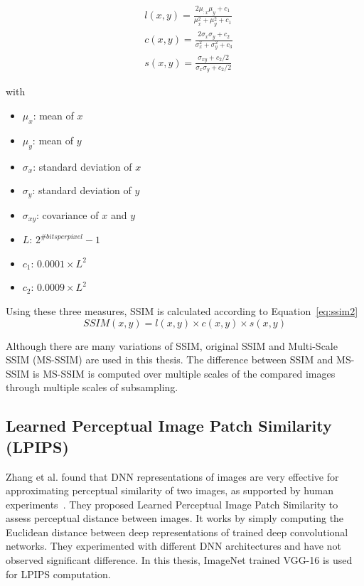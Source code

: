 \begin{equation}
    \label{eq:ssim1}
    \begin{aligned}
         & l(x, y)=\frac{2 \mu_{: x} \mu_{y}+c_{1}}{\mu_{x}^{2}+\mu_{y}^{2}+c_{1}}           \\
         & c(x, y)=\frac{2 \sigma_{x} \sigma_{y}+c_{2}}{\sigma_{x}^{2}+\sigma_{y}^{2}+c_{3}} \\
         & s(x, y)=\frac{\sigma_{x y}+c_{2}/2}{\sigma_{x} \sigma_{y}+c_{2}/2}
    \end{aligned}
\end{equation}

with
\begin{itemize}
    \setlength\itemsep{0em}
    \item \(\mu_x\): mean of \(x\)
    \item \(\mu_y\): mean of \(y\)
    \item \(\sigma_x\): standard deviation of \(x\)
    \item \(\sigma_y\): standard deviation of \(y\)
    \item \(\sigma_{xy}\): covariance of \(x\) and \(y\)
    \item \(L\): \(2^{\#bits per pixel}-1\)
    \item \(c_1\): \(0.0001 \times L^2\)
    \item \(c_2\): \(0.0009 \times L^2\)
\end{itemize}

Using these three measures, SSIM is calculated according to Equation~\ref{eq:ssim2}
\begin{equation}
    \label{eq:ssim2}
    SSIM(x,y) = l(x,y) \times c(x,y) \times s(x,y)
\end{equation}

Although there are many variations of SSIM, original SSIM and Multi-Scale SSIM (MS-SSIM) are used in this thesis. The difference between SSIM and MS-SSIM is MS-SSIM is computed over multiple scales of the compared images through multiple scales of subsampling.

\subsection{Learned Perceptual Image Patch Similarity (LPIPS)}
Zhang et al. found that DNN representations of images are very effective for approximating perceptual similarity of two images, as supported by human experiments~\cite{zhang2018unreasonable}. They proposed Learned Perceptual Image Patch Similarity to assess perceptual distance between images. It works by simply computing the Euclidean distance between deep representations of trained deep convolutional networks. They experimented with different DNN architectures and have not observed significant difference. In this thesis, ImageNet trained VGG-16 is used for LPIPS computation.


